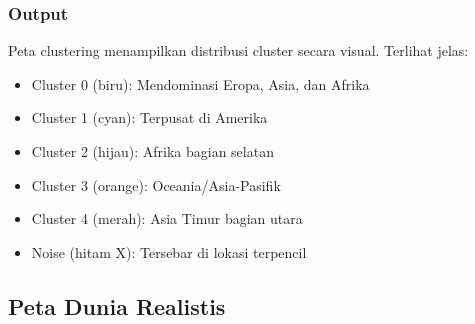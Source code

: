\documentclass[12pt,a4paper]{article}
\begin{document}
\subsubsection{Output}
Peta clustering menampilkan distribusi cluster secara visual. Terlihat jelas:
\begin{itemize}
    \item Cluster 0 (biru): Mendominasi Eropa, Asia, dan Afrika
    \item Cluster 1 (cyan): Terpusat di Amerika
    \item Cluster 2 (hijau): Afrika bagian selatan
    \item Cluster 3 (orange): Oceania/Asia-Pasifik
    \item Cluster 4 (merah): Asia Timur bagian utara
    \item Noise (hitam X): Tersebar di lokasi terpencil
\end{itemize}

\subsection{Peta Dunia Realistis}
\end{document}
